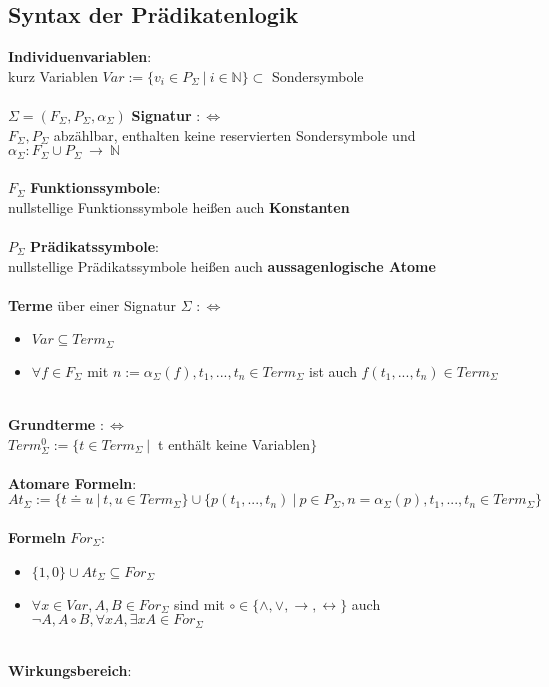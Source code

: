 \documentclass[a4paper,11pt]{scrartcl}
\newcommand{\tbf}{\textbf}
\newcommand{\Lra}{\Leftrightarrow}
\newcommand{\Funk}{F_\Sigma}
\newcommand{\Prad}{P_\Sigma}
\newcommand{\stell}{\alpha_\Sigma}
\newcommand{\Term}{Term_\Sigma}
\newcommand{\At}{At_\Sigma}
\newcommand{\For}{For_\Sigma}
\newcommand{\nat}{\mathbb{N}}
\theoremstyle{default}
\begin{document}
\subsection{Syntax der Prädikatenlogik}
\tbf{Individuenvariablen}: \\
kurz Variablen $Var := \{ v_i \in \Prad \ | \ i \in \nat \} \subset$ Sondersymbole \\
\ \\ $\Sigma = (\Funk, \Prad, \stell)$ \tbf{Signatur} $:\Lra$ \\
$\Funk, \Prad$ abzählbar, enthalten keine reservierten Sondersymbole und $\stell: \Funk \cup \Prad \ \rightarrow \ \nat$ \\
\ \\ $\Funk$ \tbf{Funktionssymbole}: \\
nullstellige Funktionssymbole heißen auch \tbf{Konstanten} \\
\ \\ $\Prad$ \tbf{Prädikatssymbole}: \\
nullstellige Prädikatssymbole heißen auch \tbf{aussagenlogische Atome} \\
\ \\ \tbf{Terme} über einer Signatur $\Sigma$ $:\Lra$
\begin{itemize}
 \item $Var \subseteq \Term$
 \item $\forall f \in \Funk$ mit $n := \stell(f), t_1, ..., t_n \in \Term$ ist auch $f(t_1, ..., t_n) \in \Term$
\end{itemize}
\ \\ \tbf{Grundterme} $:\Lra$ \\
$\Term^0 := \{ t \in \Term \ | \ $ t enthält keine Variablen$\}$\\
\ \\ \tbf{Atomare Formeln}: \\
$\At := \{ t \doteq u \ | \ t,u \in \Term \} \cup \{ p(t_1, ..., t_n) \ | \ p \in \Prad, n=\stell(p), t_1, ..., t_n \in \Term \}$ \\
\ \\ \tbf{Formeln} $\For$:
\begin{itemize}
 \item $\{1, 0\} \cup \At \subseteq \For$
 \item $\forall x \in Var, A,B \in \For$ sind mit $\circ \in \{\land, \lor, \rightarrow, \leftrightarrow \}$ auch $\neg A, A \circ B, \forall x A, \exists x A \in \For$
\end{itemize}
\ \\ \tbf{Wirkungsbereich}: \\
\end{document}

